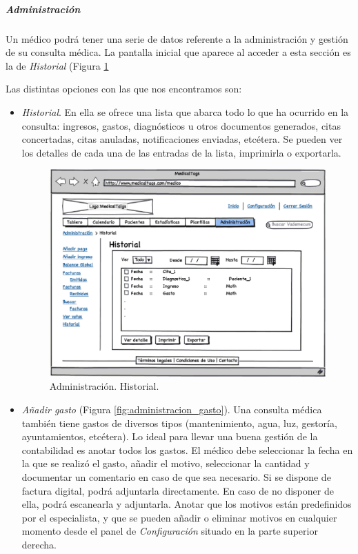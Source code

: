 \documentclass[a4paper,oneside,11pt]{book}
\begin{document}
		
		\subparagraph{Administración} %
		\label{par:medico_administracion}
		
			Un médico podrá tener una serie de datos referente a la administración y gestión de su consulta médica. La pantalla inicial que aparece al acceder a esta sección es la de \textit{Historial} (Figura \ref{fig:administracion_historial}
			
			Las distintas opciones con las que nos encontramos son:
			
			\begin{itemize}
				\item \textit{Historial}. En ella se ofrece una lista que abarca todo lo que ha ocurrido en la consulta: ingresos, gastos, diagnósticos u otros documentos generados, citas concertadas, citas anuladas, notificaciones enviadas, etcétera. Se pueden ver los detalles de cada una de las entradas de la lista, imprimirla o exportarla.
				
				
					\begin{figure}[H]
				  		\centering
				    	\includegraphics[width=12cm]{img/eps/22_1_Administracion_Historial_Medico.eps}
				  		\caption{Administración. Historial.}
				  		\label{fig:administracion_historial}
					\end{figure}
				
				\item \textit{Añadir gasto} (Figura \ref{fig:administracion_gasto}). Una consulta médica también tiene gastos de diversos tipos (mantenimiento, agua, luz, gestoría, ayuntamientos, etcétera). Lo ideal para llevar una buena gestión de la contabilidad es anotar todos los gastos. El médico debe seleccionar la fecha en la que se realizó el gasto, añadir el motivo, seleccionar la cantidad y documentar un comentario en caso de que sea necesario. Si se dispone de factura digital, podrá adjuntarla directamente. En caso de no disponer de ella, podrá escanearla y adjuntarla. Anotar que los motivos están predefinidos por el especialista, y que se pueden añadir o eliminar motivos en cualquier momento desde el panel de \textit{Configuración} situado en la parte superior derecha.
				

\end{itemize}
\end{document}
